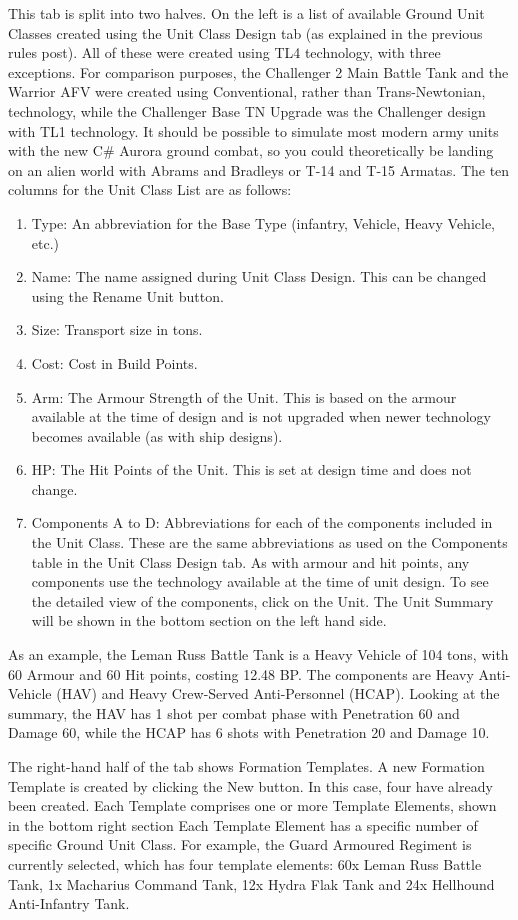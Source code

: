 \documentclass[../Aurora C# unofficial manual.tex]{subfiles}
\begin{document}
	This tab is split into two halves. On the left is a list of available Ground Unit Classes created using the Unit Class Design tab (as explained in the previous rules post). All of these were created using TL4 technology, with three exceptions. For comparison purposes, the Challenger 2 Main Battle Tank and the Warrior AFV were created using Conventional, rather than Trans-Newtonian, technology, while the Challenger Base TN Upgrade was the Challenger design with TL1 technology. It should be possible to simulate most modern army units with the new C\# Aurora ground combat, so you could theoretically be landing on an alien world with Abrams and Bradleys or T-14 and T-15 Armatas. The ten columns for the Unit Class List are as follows:
	\begin{enumerate}
		\item Type: An abbreviation for the Base Type (infantry, Vehicle, Heavy Vehicle, etc.)
		\item Name: The name assigned during Unit Class Design. This can be changed using the Rename Unit button.
		\item Size: Transport size in tons.
		\item Cost: Cost in Build Points.
		\item Arm: The Armour Strength of the Unit. This is based on the armour available at the time of design and is not upgraded when newer technology becomes available (as with ship designs).
		\item HP: The Hit Points of the Unit. This is set at design time and does not change.
		\item Components A to D: Abbreviations for each of the components included in the Unit Class. These are the same abbreviations as used on the Components table in the Unit Class Design tab. As with armour and hit points, any components use the technology available at the time of unit design. To see the detailed view of the components, click on the Unit. The Unit Summary will be shown in the bottom section on the left hand side.
	\end{enumerate} 
	
	As an example, the Leman Russ Battle Tank is a Heavy Vehicle of 104 tons, with 60 Armour and 60 Hit points, costing 12.48 BP. The components are Heavy Anti-Vehicle (HAV) and Heavy Crew-Served Anti-Personnel (HCAP). Looking at the summary, the HAV has 1 shot per combat phase with Penetration 60 and Damage 60, while the HCAP has 6 shots with Penetration 20 and Damage 10.
	
	The right-hand half of the tab shows Formation Templates. A new Formation Template is created by clicking the New button. In this case, four have already been created. Each Template comprises one or more Template Elements, shown in the bottom right section Each Template Element has a specific number of specific Ground Unit Class. For example, the Guard Armoured Regiment is currently selected, which has four template elements: 60x Leman Russ Battle Tank, 1x Macharius Command Tank, 12x Hydra Flak Tank and 24x Hellhound Anti-Infantry Tank.
	
\end{document}
